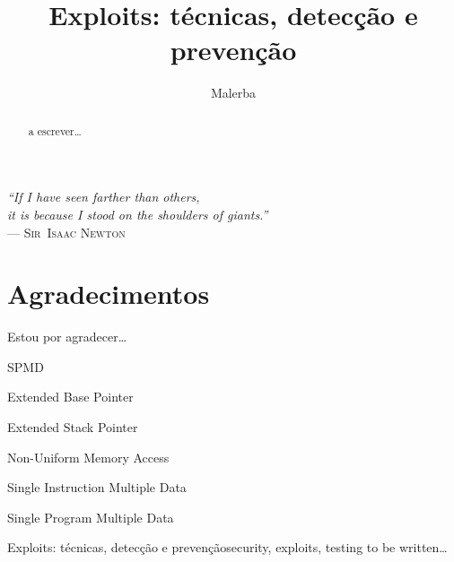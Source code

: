 \documentclass[t]{iiufrgs}
\title{Exploits: técnicas, detecção e prevenção}
\author{Malerba}{César}
\begin{document}
\maketitle

\clearpage
\begin{flushright}
\mbox{}\vfill
{\sffamily\itshape
``If I have seen farther than others,\\
it is because I stood on the shoulders of giants.''\\}
--- \textsc{Sir~Isaac Newton}
\end{flushright}

\chapter*{Agradecimentos}
Estou por agradecer\ldots

\tableofcontents

\begin{listofabbrv}{SPMD}
        \item[EBP] Extended Base Pointer
		\item[ESP] Extended Stack Pointer
        \item[NUMA] Non-Uniform Memory Access
        \item[SIMD] Single Instruction Multiple Data
        \item[SPMD] Single Program Multiple Data
\end{listofabbrv}


\listoffigures


\begin{abstract}
a escrever\ldots
\end{abstract}

\begin{englishabstract}{Exploits: técnicas, detecção e prevenção}{security, exploits, testing}
to be written\ldots
\end{englishabstract}
\end{document}
